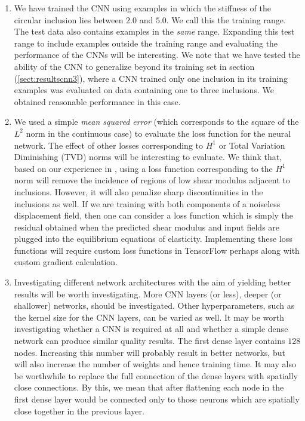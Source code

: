 \documentclass[10pt]{article}
\begin{document}
\begin{enumerate}
\item{We have trained the CNN using examples in which the stiffness of the circular inclusion lies between $2.0$ and $5.0$. We call this the training range. The test data also contains examples in the \textit{same} range. Expanding this test range to include examples outside the training range and evaluating the performance of the CNNs will be interesting. We note that we have tested the ability of the CNN to generalize beyond its training set in section (\ref{sect:resultscnn3}), where a CNN trained only one inclusion in its training examples was evaluated on data containing one to three inclusions. We obtained reasonable performance in this case.}
\item{We used a simple \textit{mean squared error} (which corresponds to the square of the $L^2$ norm in the continuous case) to evaluate the loss function for the neural network. The effect of other losses corresponding to $H^1$ or Total Variation Diminishing (TVD) norms will be interesting to evaluate. We think that, based on our experience in \cite{diss:gokhale2007}, using a loss function corresponding to the $H^1$ norm will remove the incidence of regions of low shear modulus adjacent to inclusions. However, it will also penalize sharp discontinuities in the inclusions as well. If we are training with both components of a noiseless displacement field, then one can consider a loss function which is simply the residual obtained when the predicted shear modulus and input fields are plugged into the equilibrium equations of elasticity. Implementing these loss functions will require custom loss functions in TensorFlow perhaps along with custom gradient calculation.}
\item{Investigating different network architectures with the aim of yielding better results will be worth investigating. More CNN layers (or less), deeper (or shallower) networks, should be investigated. Other hyperparameters, such as the kernel size for the CNN layers, can be varied as well. It may be worth investigating whether a CNN is required at all and whether a simple dense network can produce similar quality results. The first dense layer contains $128$ nodes. Increasing this number will probably result in better networks, but will also increase the number of weights and hence training time. It may also be worthwhile to replace the full connection of the dense layers with spatially close connections. By this, we mean that after flattening each node in the first dense layer would be connected only to those neurons which are spatially close together in the previous layer.}

\end{enumerate}
\end{document}
